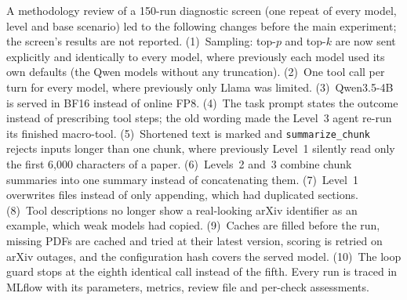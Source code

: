 A methodology review of a 150-run diagnostic screen (one repeat of every model, level and base scenario) led to the following changes before the main experiment; the screen's results are not reported. (1)~Sampling: top-$p$ and top-$k$ are now sent explicitly and identically to every model, where previously each model used its own defaults (the Qwen models without any truncation). (2)~One tool call per turn for every model, where previously only Llama was limited. (3)~Qwen3.5-4B is served in BF16 instead of online FP8. (4)~The task prompt states the outcome instead of prescribing tool steps; the old wording made the Level~3 agent re-run its finished macro-tool. (5)~Shortened text is marked and \texttt{summarize\_chunk} rejects inputs longer than one chunk, where previously Level~1 silently read only the first 6{,}000 characters of a paper. (6)~Levels~2 and~3 combine chunk summaries into one summary instead of concatenating them. (7)~Level~1 overwrites files instead of only appending, which had duplicated sections. (8)~Tool descriptions no longer show a real-looking arXiv identifier as an example, which weak models had copied. (9)~Caches are filled before the run, missing PDFs are cached and tried at their latest version, scoring is retried on arXiv outages, and the configuration hash covers the served model. (10)~The loop guard stops at the eighth identical call instead of the fifth. Every run is traced in MLflow with its parameters, metrics, review file and per-check assessments.
